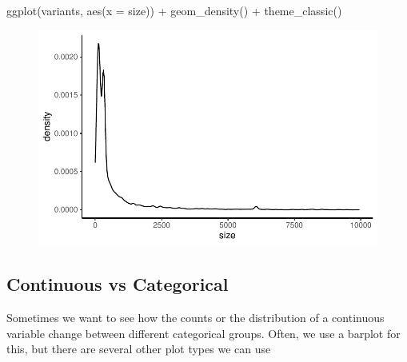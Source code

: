 \documentclass[
  letterpaper,
  DIV=11,
  numbers=noendperiod]{scrreprt}
\newenvironment{Shaded}{\begin{snugshade}}{\end{snugshade}}
\newcommand{\AttributeTok}[1]{\textcolor[rgb]{0.40,0.45,0.13}{#1}}
\newcommand{\FunctionTok}[1]{\textcolor[rgb]{0.28,0.35,0.67}{#1}}
\newcommand{\NormalTok}[1]{\textcolor[rgb]{0.00,0.23,0.31}{#1}}
\newcommand{\SpecialCharTok}[1]{\textcolor[rgb]{0.37,0.37,0.37}{#1}}
\begin{document}
\begin{Shaded}
\begin{Highlighting}[]
\FunctionTok{ggplot}\NormalTok{(variants, }\FunctionTok{aes}\NormalTok{(}\AttributeTok{x =}\NormalTok{ size)) }\SpecialCharTok{+}
  \FunctionTok{geom\_density}\NormalTok{() }\SpecialCharTok{+}
  \FunctionTok{theme\_classic}\NormalTok{()}
\end{Highlighting}
\end{Shaded}

\begin{figure}[H]

{\centering \includegraphics{scripts/02_dataViz/class3_files/figure-pdf/unnamed-chunk-15-1.pdf}

}

\end{figure}

\hypertarget{continuous-vs-categorical}{%
\subsection{Continuous vs Categorical}\label{continuous-vs-categorical}}

Sometimes we want to see how the counts or the distribution of a
continuous variable change between different categorical groups. Often,
we use a barplot for this, but there are several other plot types we can
use
\end{document}
